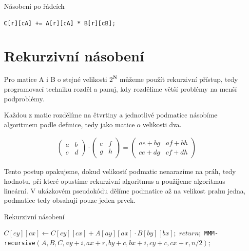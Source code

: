 \begin{algorithm}[H]
	\caption{Násobení po řádcích}\label{mmm-by-rows}
	\begin{algorithmic}[1]
			\State \texttt{C[r][cA] += A[r][cA] * B[r][cB];}
		\EndFor
	\EndFor
\EndFor
		\EndProcedure
	\end{algorithmic}
\end{algorithm}


\section{Rekurzivní násobení}

Pro matice A i B o stejné velikosti $ {2^\mathbf{N}} $ můžeme použít rekurzivní přístup, tedy programovací techniku rozděl a panuj, kdy rozdělíme větší problémy na menší podproblémy.

Každou z matic rozdělíme na čtvrtiny a jednotlivé podmatice násobíme algoritmem podle definice, tedy jako matice o velikosti dva.

\label{RecMul}
\label{2x2MMM}
\begin{align}
\begin{pmatrix}
 a & b \\
 c & d
\end{pmatrix} \cdot \begin{pmatrix}
 e & f \\
 g & h
\end{pmatrix} = \begin{pmatrix}
 ae+bg & af+bh \\
 ce+dg & cf+dh
\end{pmatrix}
\end{align}

Tento postup opakujeme, dokud velikostí podmatic nenarazíme na práh, tedy hodnotu, při které opustíme rekurzivní algoritmus a použijeme algoritmus lineární. V ukázkovém pseudokódu dělíme podmatice až na velikost prahu jedna, podmatice tedy obsahují pouze jeden prvek.

\begin{algorithm}[H]
	\caption{Rekurzivní násobení}\label{mmm-recursive}
	\begin{algorithmic}[1]
			\State \texttt{$C[cy][cx]\gets C[cy][cx] + A[ay][ax] \cdot B[by][bx];$}
			\State \texttt{$return;$}
		\EndIf
					\State \texttt{MMM-recursive$(A,B,C,ay+i,ax+r,by+c,bx+i,cy+c,cx+r,n/2);$}
				\EndFor
			\EndFor
		\EndFor
		\EndProcedure
	\end{algorithmic}
\end{algorithm}

